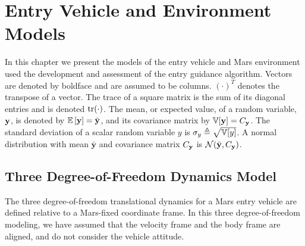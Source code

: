 \chapter{Entry Vehicle and Environment Models}
In this chapter we present the models of the entry vehicle and Mars environment used the development and assessment of the entry guidance algorithm.
Vectors are denoted by boldface and are assumed to be columns. $(\cdot)^T$ denotes the transpose of a vector. 
The trace of a square matrix is the sum of its diagonal entries and is denoted $\mathrm{tr}(\cdot)$.   
The mean, or expected value, of a random variable, $\mathbf{y}$, is denoted by $\mathbb{E}\left[\mathbf{y}\right]=\bar{\mathbf{y}}$, and its covariance matrix by $\mathbb{V}[\mathbf{y}] = C_{\mathbf{y}}$. 
The standard deviation of a scalar random variable $y$ is $\sigma_{y} \triangleq \sqrt{\mathbb{V}[y]}$. A normal distribution with mean $\bar{\mathbf{y}}$ and covariance matrix $C_{\mathbf{y}}$ is $\mathcal{N}(\bar{\mathbf{y}}, C_{\mathbf{y}})$.

\section{Three Degree-of-Freedom Dynamics Model}
The three degree-of-freedom translational dynamics for a Mars entry vehicle are defined relative to a Mars-fixed coordinate frame. In this three degree-of-freedom modeling, we have assumed that the velocity frame and the body frame are aligned, and do not consider the vehicle attitude.
  
